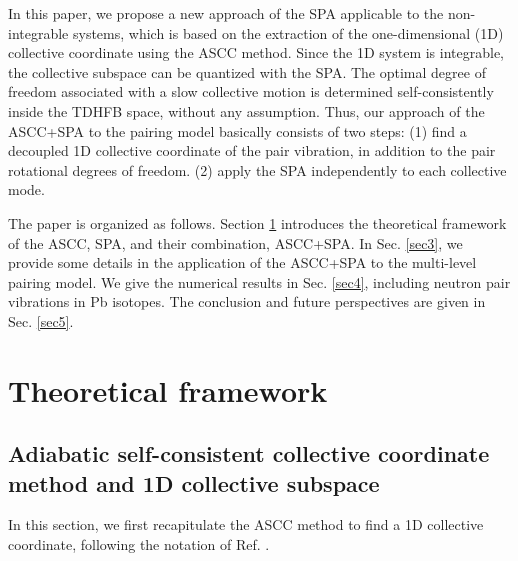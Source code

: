 \documentclass[%
superscriptaddress,
showpacs,
nofootinbib,
amsmath,amssymb,
aps,
prc,
twocolumn,
floatfix ]%
{revtex4-1}
\begin{document}
In this paper,
we propose a new approach of the SPA applicable to the non-integrable systems,
which is based on the extraction of the one-dimensional (1D)
collective coordinate
using the ASCC method.
Since the 1D system is integrable,
the collective subspace can be quantized with the SPA.
The optimal degree of freedom associated with a slow collective motion
is determined self-consistently
inside the TDHFB space, without any assumption. 
Thus, our approach of the ASCC+SPA to the pairing model
basically consists of two steps:
(1) find a decoupled 1D collective coordinate of the pair vibration,
in addition to the pair rotational degrees of freedom.
(2) apply the SPA independently to each collective mode.

The paper is organized as follows. 
Section \ref{sec2} introduces the theoretical framework of the ASCC, SPA,
and their combination, ASCC+SPA. 
In Sec. \ref{sec3}, we provide some details in the application
of the ASCC+SPA to the multi-level pairing model.
We give the numerical results in Sec. \ref{sec4}, including
neutron pair vibrations in Pb isotopes.
The conclusion and future perspectives are given in Sec. \ref{sec5}.


\section{Theoretical framework}
\label{sec2}

\subsection{Adiabatic self-consistent collective coordinate method and
1D collective subspace}
\label{sec:ASCC}
In this section,
we first recapitulate the ASCC method to find a 1D collective coordinate,
following the notation of Ref. \cite{N2012}.
\end{document}
